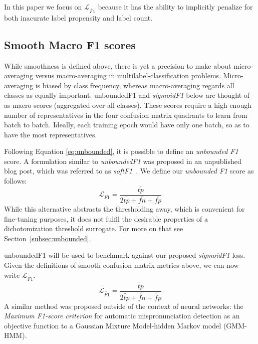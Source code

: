In this paper we focus on $\mathcal{L}_{\widetilde{\mathit{F1}}}$ because it has the ability to implicitly penalize for both inacurate label propensity and label count.


\subsection{Smooth Macro F1 scores}
\label{sec:orgc5d29d7}

While smoothness is defined above, there is yet a precision to make about micro-averaging versus macro-averaging in multilabel-classification problems. Micro-averaging is biased by class frequency, whereas macro-averaging regards all classes as equally important. unboundedF1 and \emph{sigmoidF1} below are thought of as macro scores (aggregated over all classes). These scores require a high enough number of representatives in the four confusion matrix quadrants to learn from batch to batch. Ideally, each training epoch would have only one batch, so as to have the most representatives.

Following Equation \ref{eq:unbounded}, it is possible to define an \emph{unbounded F1} score. A formulation similar to \emph{unboundedF1} was proposed in an unpublished blog post, which was referred to as \emph{softF1}~\cite{softF1}. We define our \emph{unbounded F1} score as follows:
%
\begin{equation}
\mathcal{L}_{\overline{\mathit{F1}}}= \frac{\overline{tp}}{2 \overline{tp}+ \overline{fn}+ \overline{fp}}
\end{equation}
%
While this alternative abstracts the thresholding away, which is convenient for fine-tuning purposes, it does not fulfil the desirable properties of a dichotomization threshold surrogate. For more on that see Section~\ref{subsec:unbounded}.

unboundedF1 will be used to benchmark against our proposed \emph{sigmoidF1} loss. Given the definitions of smooth confusion matrix metrics above, we can now write $\mathcal{L}_{\widetilde{\mathit{F1}}}$.
%
\begin{equation}\label{eq:sigmoidF1}
\mathcal{L}_{\widetilde{\mathit{F1}}}= \frac{\widetilde{\mathit{tp}}}{2 \widetilde{\mathit{tp}}+ \widetilde{\mathit{fn}}+ \widetilde{\mathit{fp}}}
\end{equation}
%
A similar method was proposed outside of the context of neural networks: the \emph{Maximum F1-score criterion} for automatic mispronunciation detection as an objective function to a Gaussian Mixture Model-hidden Markov model (GMM-HMM)\cite{sigmoid}.

